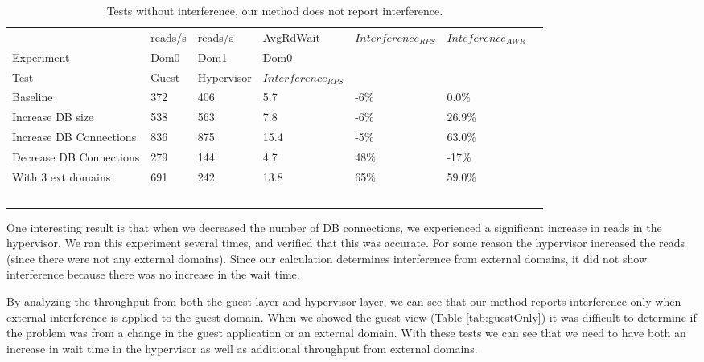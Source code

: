 \begin{table}[h]
\begingroup
    \fontsize{10pt}{12pt}\selectfont
\begin{tabular}{ l l l l l l p{9cm} }
                   & reads/s & reads/s & AvgRdWait & $Interference_{RPS}$ & $Inteference_{AWR}$ \\
	Experiment     & Dom0     & Dom1     & Dom0      &                &             \\

    Test & Guest & Hypervisor  & $Interference_{RPS}$ \\
    \hline
    Baseline                   & 372 & 406 & 5.7 & -6\% & 0.0\%   \\  %
    Increase DB size           & 538 & 563 & 7.8 & -6\% & 26.9\% \\  %
    Increase DB Connections    & 836 & 875 &15.4 & -5\% & 63.0\% \\  %
	Decrease DB Connections    & 279 & 144 & 4.7 & 48\% & -17\%  \\  %
    With 3 ext domains         & 691 & 242 &13.8 & 65\% & 59.0\% \\  %
    \hline
  \end{tabular}
\caption{Tests without interference, our method does not report interference. }
\label{tab:HypervisorGuest}
\endgroup
\end{table}

One interesting result is that when we decreased the number of DB connections, we experienced a significant increase in reads in the hypervisor.  We ran this experiment several times, and verified that this was accurate.  For some reason the hypervisor increased the reads (since there were not any external domains).  Since our calculation determines interference from external domains, it did not show interference because there was no increase in the wait time.

By analyzing the throughput from both the guest layer and hypervisor layer, we can see that our method reports interference only when external interference is applied to the guest domain.  When we showed the guest view (Table \ref{tab:guestOnly}) it was difficult to determine if the problem was from a change in the guest application or an external domain.  With these tests we can see that we need to have both an increase in wait time in the hypervisor as well as additional throughput from external domains.


